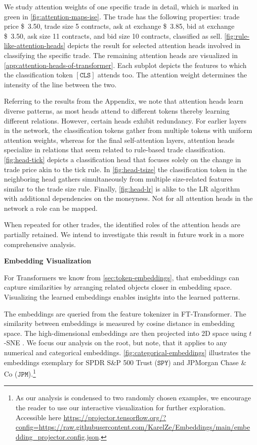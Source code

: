 We study attention weights of one specific trade in detail, which is marked in green in \cref{fig:attention-maps-ise}. The trade has the following properties: trade price \SI{3.50}[\$]{}, trade size \SI{5}[]{} contracts, ask at exchange \SI{3.85}[\$]{}, bid at exchange \SI{3.50}[\$]{}, ask size \SI{11}[]{} contracts, and bid size \SI{10}[]{} contracts, classified as sell. \cref{fig:rule-like-attention-heads} depicts the result for selected attention heads involved in classifying the specific trade. The remaining attention heads are visualized in \cref{app:attention-heads-of-transformer}. Each subplot depicts the features to which the classification token $\mathtt{[CLS]}$ attends too. The attention weight determines the intensity of the line between the two. 

Referring to the results from the Appendix, we note that attention heads learn diverse patterns, as most heads attend to different tokens thereby learning different relations. However, certain heads exhibit redundancy. For earlier layers in the network, the classification tokens gather from multiple tokens with uniform attention weights, whereas for the final self-attention layers, attention heads specialize in relations that seem related to rule-based trade classification. \cref{fig:head-tick} depicts a classification head that focuses solely on the change in trade price akin to the tick rule. In \cref{fig:head-tsize} the classification token in the neighboring head gathers simultaneously from multiple size-related features similar to the trade size rule. Finally, \cref{fig:head-lr} is alike to the \gls{LR} algorithm with additional dependencies on the moneyness. Not for all attention heads in the network a role can be mapped. 

When repeated for other trades, the identified roles of the attention heads are partially retained. We intend to investigate this result in future work in a more comprehensive analysis.

\textbf{Embedding Visualization}

For Transformers we know from \cref{sec:token-embeddings}, that embeddings can capture similarities by arranging related objects closer in embedding space. Visualizing the learned embeddings enables insights into the learned patterns.

The embeddings are queried from the feature tokenizer in FT-Transformer. The similarity between embeddings is measured by cosine distance in embedding space. The high-dimensional embeddings are then projected into 2D space using $t$-SNE \autocite[][2587]{vandermaatenVisualizingDataUsing2008}. We focus our analysis on the root, but note, that it applies to any numerical and categorical embeddings. \cref{fig:categorical-embeddings} illustrates the embeddings exemplary for SPDR S\&P 500 Trust ($\mathtt{SPY}$) and JPMorgan Chase \& Co ($\mathtt{JPM}$).\footnote{As our analysis is condensed to two randomly chosen examples, we encourage the reader to use our interactive visualization for further exploration. Accessible here \url{https://projector.tensorflow.org/?config=https://raw.githubusercontent.com/KarelZe/Embeddings/main/embedding_projector.config.json}.}

